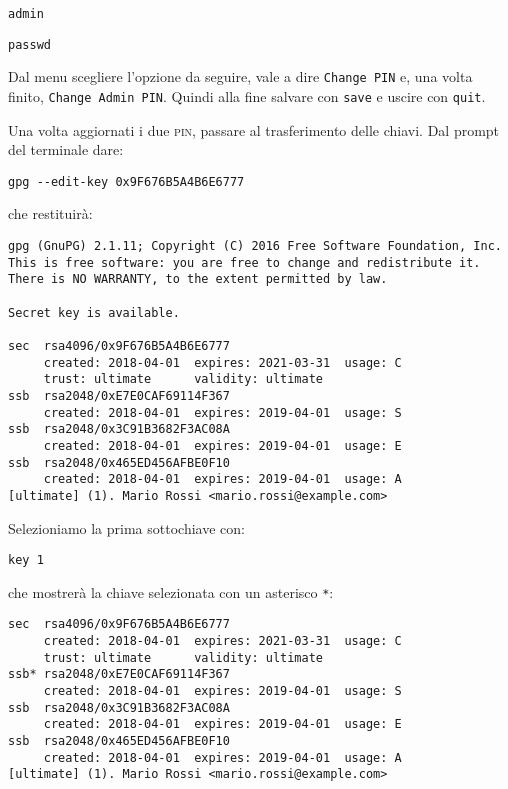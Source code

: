 \begin{lstlisting}
admin
\end{lstlisting}

\begin{lstlisting}
passwd
\end{lstlisting}

Dal menu scegliere l'opzione da seguire, vale a dire \texttt{Change PIN} e, una
volta finito, \texttt{Change Admin PIN}. Quindi alla fine salvare con
\texttt{save} e uscire con \texttt{quit}.

Una volta aggiornati i due \textsc{pin}, passare al trasferimento delle chiavi.
Dal prompt del terminale dare:

\begin{lstlisting}
gpg --edit-key 0x9F676B5A4B6E6777
\end{lstlisting}

che restituirà:

\begin{lstlisting}
gpg (GnuPG) 2.1.11; Copyright (C) 2016 Free Software Foundation, Inc.
This is free software: you are free to change and redistribute it.
There is NO WARRANTY, to the extent permitted by law.

Secret key is available.

sec  rsa4096/0x9F676B5A4B6E6777
     created: 2018-04-01  expires: 2021-03-31  usage: C
     trust: ultimate      validity: ultimate
ssb  rsa2048/0xE7E0CAF69114F367
     created: 2018-04-01  expires: 2019-04-01  usage: S
ssb  rsa2048/0x3C91B3682F3AC08A
     created: 2018-04-01  expires: 2019-04-01  usage: E
ssb  rsa2048/0x465ED456AFBE0F10
     created: 2018-04-01  expires: 2019-04-01  usage: A
[ultimate] (1). Mario Rossi <mario.rossi@example.com>
\end{lstlisting}

Selezioniamo la prima sottochiave con:

\begin{lstlisting}
key 1
\end{lstlisting}

che mostrerà la chiave selezionata con un asterisco \texttt{*}:

\begin{lstlisting}
sec  rsa4096/0x9F676B5A4B6E6777
     created: 2018-04-01  expires: 2021-03-31  usage: C
     trust: ultimate      validity: ultimate
ssb* rsa2048/0xE7E0CAF69114F367
     created: 2018-04-01  expires: 2019-04-01  usage: S
ssb  rsa2048/0x3C91B3682F3AC08A
     created: 2018-04-01  expires: 2019-04-01  usage: E
ssb  rsa2048/0x465ED456AFBE0F10
     created: 2018-04-01  expires: 2019-04-01  usage: A
[ultimate] (1). Mario Rossi <mario.rossi@example.com>
\end{lstlisting}


